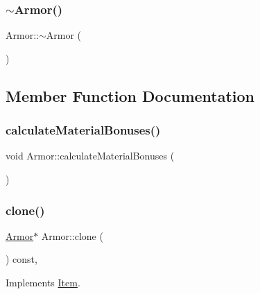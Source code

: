 \subsubsection{\texorpdfstring{$\sim$\+Armor()}{~Armor()}}
{\footnotesize\ttfamily Armor\+::$\sim$\+Armor (\begin{DoxyParamCaption}{ }\end{DoxyParamCaption})}



\subsection{Member Function Documentation}
\mbox{\label{class_armor_ac86ccbc735cc83849f1c62099285a0c9}} 
\subsubsection{\texorpdfstring{calculate\+Material\+Bonuses()}{calculateMaterialBonuses()}}
{\footnotesize\ttfamily void Armor\+::calculate\+Material\+Bonuses (\begin{DoxyParamCaption}{ }\end{DoxyParamCaption})}

\mbox{\label{class_armor_aac8aec108de9a8a45bada1534c0f23b7}} 
\subsubsection{\texorpdfstring{clone()}{clone()}}
{\footnotesize\ttfamily \mbox{\hyperlink{class_armor}{Armor}}$\ast$ Armor\+::clone (\begin{DoxyParamCaption}{ }\end{DoxyParamCaption}) const\hspace{0.3cm}{\ttfamily [inline]}, {\ttfamily [virtual]}}



Implements \mbox{\hyperlink{class_item_a6d963581e2caad2e08979683a827f39f}{Item}}.

